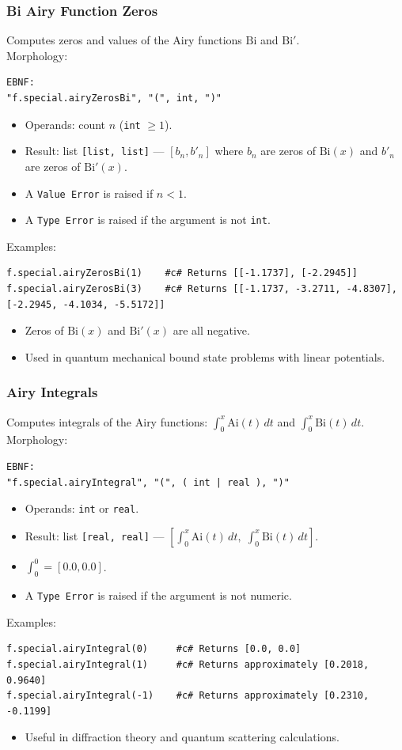 \subsubsection{Bi Airy Function Zeros}
Computes zeros and values of the Airy functions $\text{Bi}$ and $\text{Bi}'$. \\
Morphology:
\begin{verbatim}
EBNF:
"f.special.airyZerosBi", "(", int, ")"
\end{verbatim}
\begin{itemize}
\item Operands: count $n$ (\texttt{int} $\geq 1$).
\item Result: list \texttt{[list, list]} --- $[b_n, b'_n]$ where $b_n$ are zeros of $\text{Bi}(x)$ and $b'_n$ are zeros of $\text{Bi}'(x)$.
\item A \texttt{Value Error} is raised if $n < 1$.
\item A \texttt{Type Error} is raised if the argument is not \texttt{int}.
\end{itemize}
Examples:
\begin{verbatim}
f.special.airyZerosBi(1)    #c# Returns [[-1.1737], [-2.2945]]
f.special.airyZerosBi(3)    #c# Returns [[-1.1737, -3.2711, -4.8307], [-2.2945, -4.1034, -5.5172]]
\end{verbatim}
\begin{itemize}
\item Zeros of $\text{Bi}(x)$ and $\text{Bi}'(x)$ are all negative.
\item Used in quantum mechanical bound state problems with linear potentials.
\end{itemize}

\subsubsection{Airy Integrals}
Computes integrals of the Airy functions: $\int_0^x \text{Ai}(t)\,dt$ and $\int_0^x \text{Bi}(t)\,dt$. \\
Morphology:
\begin{verbatim}
EBNF:
"f.special.airyIntegral", "(", ( int | real ), ")"
\end{verbatim}
\begin{itemize}
\item Operands: \texttt{int} or \texttt{real}.
\item Result: list \texttt{[real, real]} --- $[\int_0^x \text{Ai}(t)\,dt,\; \int_0^x \text{Bi}(t)\,dt]$.
\item $\int_0^0 = [0.0, 0.0]$.
\item A \texttt{Type Error} is raised if the argument is not numeric.
\end{itemize}
Examples:
\begin{verbatim}
f.special.airyIntegral(0)     #c# Returns [0.0, 0.0]
f.special.airyIntegral(1)     #c# Returns approximately [0.2018, 0.9640]
f.special.airyIntegral(-1)    #c# Returns approximately [0.2310, -0.1199]
\end{verbatim}
\begin{itemize}
\item Useful in diffraction theory and quantum scattering calculations.
\end{itemize}

